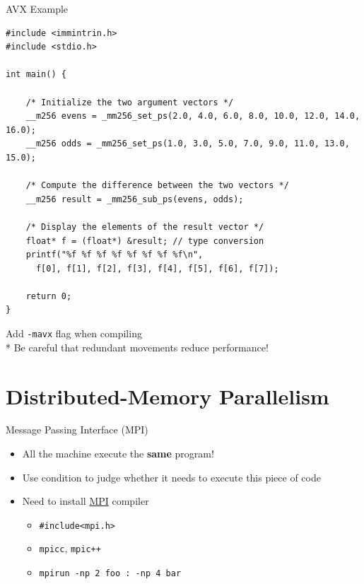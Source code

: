 \documentclass{../TexTemplate/myslide}
\begin{document}
\begin{frame}[fragile]{AVX Example}
\begin{lstlisting}[basicstyle=\scriptsize]
#include <immintrin.h>
#include <stdio.h>

int main() {

    /* Initialize the two argument vectors */
    __m256 evens = _mm256_set_ps(2.0, 4.0, 6.0, 8.0, 10.0, 12.0, 14.0, 16.0);
    __m256 odds = _mm256_set_ps(1.0, 3.0, 5.0, 7.0, 9.0, 11.0, 13.0, 15.0);

    /* Compute the difference between the two vectors */
    __m256 result = _mm256_sub_ps(evens, odds);

    /* Display the elements of the result vector */
    float* f = (float*) &result; // type conversion
    printf("%f %f %f %f %f %f %f %f\n",
      f[0], f[1], f[2], f[3], f[4], f[5], f[6], f[7]);

    return 0;
}
\end{lstlisting}
Add \verb'-mavx' flag when compiling\\
* Be careful that redundant movements reduce performance!
\end{frame}

\section{Distributed-Memory Parallelism}
\begin{frame}
\sectionpage
\end{frame}

\begin{frame}[fragile]{Message Passing Interface (MPI)}
\begin{itemize}
\item All the machine execute the \textbf{same} program!
\item Use condition to judge whether it needs to execute this piece of code
\item Need to install \href{http://www.mpich.org/}{MPI} compiler
\begin{itemize}
	\item \verb'#include<mpi.h>'
	\item \verb'mpicc', \verb'mpic++'
	\item \verb'mpirun -np 2 foo : -np 4 bar'
\end{itemize}
\end{itemize}
\end{frame}
\end{document}
